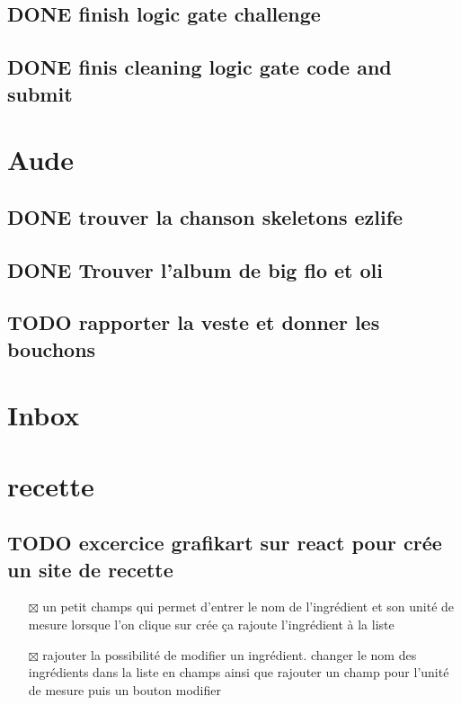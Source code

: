 \documentclass[11pt]{article}
\begin{document}
\subsection{{\bfseries\sffamily DONE} finish logic gate challenge}
\label{sec:orgb4ab78a}
\subsection{{\bfseries\sffamily DONE} finis cleaning logic gate code and submit}
\label{sec:org09b8f18}
\section{Aude}
\label{sec:org1323893}
\subsection{{\bfseries\sffamily DONE} trouver la chanson skeletons ezlife}
\label{sec:org8a51f44}
\subsection{{\bfseries\sffamily DONE} Trouver l'album de big flo et oli}
\label{sec:org18a3e85}
\subsection{{\bfseries\sffamily TODO} rapporter la veste et donner les bouchons}
\label{sec:org67e7aac}
\section{Inbox}
\label{sec:org8577f24}

\section{recette}
\label{sec:org42586b5}
\subsection{{\bfseries\sffamily TODO} excercice grafikart sur react pour crée un site de recette}
\label{sec:orgbbd06f4}
\begin{itemize}
\item[{$\boxtimes$}] un petit champs qui permet d'entrer le nom de l'ingrédient et son unité de mesure lorsque l'on clique sur crée ça rajoute l'ingrédient à la liste
\item[{$\boxtimes$}] rajouter la possibilité de modifier un ingrédient. changer le nom des ingrédients dans la liste en champs ainsi que rajouter un champ pour l'unité de mesure puis un bouton modifier
\end{itemize}
\end{document}
